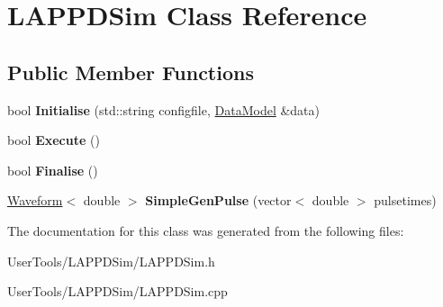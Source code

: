 \hypertarget{classLAPPDSim}{
\section{LAPPDSim Class Reference}
\label{classLAPPDSim}
}
\subsection*{Public Member Functions}
\begin{DoxyCompactItemize}
\item 
\hypertarget{classLAPPDSim_a68edcbace6d4b83bff31e3866d0cbfc1}{
bool {\bfseries Initialise} (std::string configfile, \hyperlink{classDataModel}{DataModel} \&data)}
\label{classLAPPDSim_a68edcbace6d4b83bff31e3866d0cbfc1}

\item 
\hypertarget{classLAPPDSim_a0d34e153938d2a1c6fab9c3083862000}{
bool {\bfseries Execute} ()}
\label{classLAPPDSim_a0d34e153938d2a1c6fab9c3083862000}

\item 
\hypertarget{classLAPPDSim_a97d903656a7ddbdafb5170bb672193ba}{
bool {\bfseries Finalise} ()}
\label{classLAPPDSim_a97d903656a7ddbdafb5170bb672193ba}

\item 
\hypertarget{classLAPPDSim_ab08ad145a8cea2e3d0283ba48b91fa47}{
\hyperlink{classWaveform}{Waveform}$<$ double $>$ {\bfseries SimpleGenPulse} (vector$<$ double $>$ pulsetimes)}
\label{classLAPPDSim_ab08ad145a8cea2e3d0283ba48b91fa47}

\end{DoxyCompactItemize}


The documentation for this class was generated from the following files:\begin{DoxyCompactItemize}
\item 
UserTools/LAPPDSim/LAPPDSim.h\item 
UserTools/LAPPDSim/LAPPDSim.cpp\end{DoxyCompactItemize}
